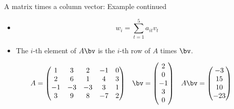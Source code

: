 \documentclass{beamer}
\begin{document}
\begin{frame}{A matrix times a column vector: Example continued}

\begin{itemize}
\item $$w_i = \sum_{t=1}^5 a_{it} v_{t}$$
\item The $i$-th element of $A\bv$ is the $i$-th row of $A$ times $\bv$.
\end{itemize}

$$
\begin{matrix}
A =

\begin{pmatrix}
1 & 3 & 2 & -1 & 0 \\
2 & 6 & 1 & 4 & 3\\
-1 & -3 & -3 & 3 & 1 \\
3 & 9 & 8 & -7 & 2
\end{pmatrix}

&

\bv =

\begin{pmatrix}
2 \\ 0 \\ -1\\ 3 \\ 0
\end{pmatrix}

&

A \bv =

\begin{pmatrix}
-3 \\ 15 \\ 10 \\ -23
\end{pmatrix}

\end{matrix}
$$

\end{frame}
\end{document}
